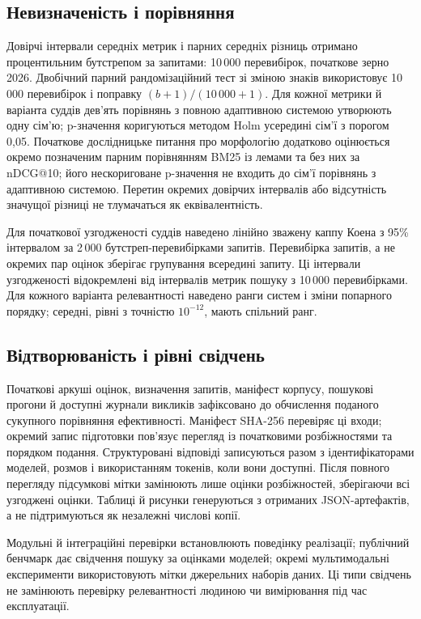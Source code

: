 \subsection{Невизначеність і порівняння}
Довірчі інтервали середніх метрик і парних середніх різниць отримано процентильним бутстрепом за запитами: 10\,000 перевибірок, початкове зерно 2026. Двобічний парний рандомізаційний тест зі зміною знаків використовує 10\,000 перевибірок і поправку $(b+1)/(10\,000+1)$. Для кожної метрики й варіанта суддів дев'ять порівнянь з повною адаптивною системою утворюють одну сім'ю; p-значення коригуються методом Holm усередині сім'ї з порогом 0,05. Початкове дослідницьке питання про морфологію додатково оцінюється окремо позначеним парним порівнянням BM25 із лемами та без них за nDCG@10; його нескориговане p-значення не входить до сім'ї порівнянь з адаптивною системою. Перетин окремих довірчих інтервалів або відсутність значущої різниці не тлумачаться як еквівалентність.

Для початкової узгодженості суддів наведено лінійно зважену каппу Коена з 95\% інтервалом за 2\,000 бутстреп-перевибірками запитів. Перевибірка запитів, а не окремих пар оцінок зберігає групування всередині запиту. Ці інтервали узгодженості відокремлені від інтервалів метрик пошуку з 10\,000 перевибірками. Для кожного варіанта релевантності наведено ранги систем і зміни попарного порядку; середні, рівні з точністю $10^{-12}$, мають спільний ранг.

\subsection{Відтворюваність і рівні свідчень}
Початкові аркуші оцінок, визначення запитів, маніфест корпусу, пошукові прогони й доступні журнали викликів зафіксовано до обчислення поданого сукупного порівняння ефективності. Маніфест SHA-256 перевіряє ці входи; окремий запис підготовки пов'язує перегляд із початковими розбіжностями та порядком подання. Структуровані відповіді записуються разом з ідентифікаторами моделей, розмов і використанням токенів, коли вони доступні. Після повного перегляду підсумкові мітки замінюють лише оцінки розбіжностей, зберігаючи всі узгоджені оцінки. Таблиці й рисунки генеруються з отриманих JSON-артефактів, а не підтримуються як незалежні числові копії.

Модульні й інтеграційні перевірки встановлюють поведінку реалізації; публічний бенчмарк дає свідчення пошуку за оцінками моделей; окремі мультимодальні експерименти використовують мітки джерельних наборів даних. Ці типи свідчень не замінюють перевірку релевантності людиною чи вимірювання під час експлуатації.

